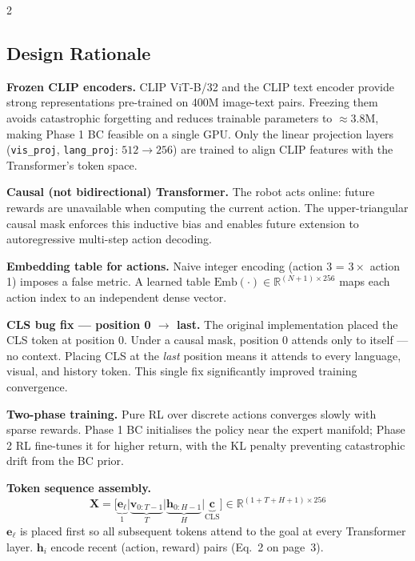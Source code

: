 \documentclass[11pt, a4paper]{article}
\begin{document}
\begin{multicols}{2}
\setlength{\parskip}{2pt}

\subsection*{Design Rationale}

\textbf{Frozen CLIP encoders.}\enspace
CLIP ViT-B/32 and the CLIP text encoder provide strong representations
pre-trained on 400M image-text pairs.  Freezing them avoids catastrophic
forgetting and reduces trainable parameters to ${\approx}3.8$M, making
Phase 1 BC feasible on a single GPU.  Only the linear projection layers
(\texttt{vis\_proj}, \texttt{lang\_proj}: $512 \to 256$) are trained to
align CLIP features with the Transformer's token space.

\medskip
\textbf{Causal (not bidirectional) Transformer.}\enspace
The robot acts online: future rewards are unavailable when computing the
current action.  The upper-triangular causal mask enforces this inductive
bias and enables future extension to autoregressive multi-step action decoding.

\medskip
\textbf{Embedding table for actions.}\enspace
Naive integer encoding (action 3 = $3\times$ action 1) imposes a false
metric.  A learned table $\mathrm{Emb}(\cdot)\!\in\!\mathbb{R}^{(N{+}1)\times256}$
maps each action index to an independent dense vector.

\columnbreak

\textbf{CLS bug fix --- position 0 $\to$ last.}\enspace
The original implementation placed the CLS token at position 0.
Under a causal mask, position 0 attends only to itself --- no context.
Placing CLS at the \emph{last} position means it attends to every
language, visual, and history token.
This single fix significantly improved training convergence.

\medskip
\textbf{Two-phase training.}\enspace
Pure RL over discrete actions converges slowly with sparse rewards.
Phase 1 BC initialises the policy near the expert manifold; Phase 2 RL
fine-tunes it for higher return, with the KL penalty preventing
catastrophic drift from the BC prior.

\medskip
\textbf{Token sequence assembly.}\enspace
\[
  \mathbf{X}\!=\!\bigl[
    \underbrace{\mathbf{e}_\ell}_{1}
    \big|
    \underbrace{\mathbf{v}_{0:T-1}}_{T}
    \big|
    \underbrace{\mathbf{h}_{0:H-1}}_{H}
    \big|
    \underbrace{\mathbf{c}}_{\text{CLS}}
  \bigr]
  \!\in\!\mathbb{R}^{(1+T+H+1)\times256}
\]
$\mathbf{e}_\ell$ is placed first so all subsequent tokens attend to the
goal at every Transformer layer.  $\mathbf{h}_i$ encode recent
(action, reward) pairs (Eq.~2 on page~3).

\end{multicols}
\end{document}
